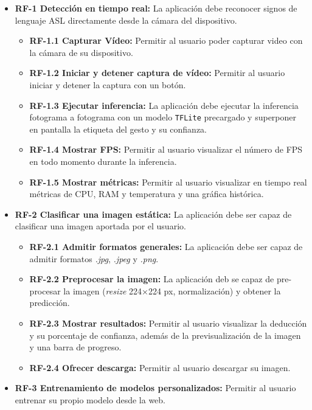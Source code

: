 \begin{itemize}
    \item \textbf{RF-1 Detección en tiempo real:} La aplicación debe reconocer signos de lenguaje ASL directamente desde la cámara del dispositivo.
        \begin{itemize}
            \item \textbf{RF-1.1 Capturar Vídeo:} Permitir al usuario poder capturar video con la cámara de su dispositivo.
            \item \textbf{RF-1.2 Iniciar y detener captura de vídeo:} Permitir al usuario iniciar y detener la captura con un botón.
            \item \textbf{RF-1.3 Ejecutar inferencia:} La aplicación debe ejecutar la inferencia fotograma a fotograma con un modelo \texttt{TFLite} precargado y superponer en pantalla la etiqueta del gesto y su confianza.
            \item \textbf{RF-1.4 Mostrar FPS:} Permitir al usuario visualizar el número de FPS en todo momento durante la inferencia.
            \item \textbf{RF-1.5 Mostrar métricas:} Permitir al usuario visualizar en tiempo real métricas de CPU, RAM y temperatura y una gráfica histórica.
        \end{itemize}
    \item \textbf{RF-2 Clasificar una imagen estática:} La aplicación debe ser capaz de clasificar una imagen aportada por el usuario.
        \begin{itemize}
            \item \textbf{RF-2.1 Admitir formatos generales:} La aplicación debe ser capaz de admitir formatos \textit{.jpg}, \textit{.jpeg} y \textit{.png}.
            \item \textbf{RF-2.2 Preprocesar la imagen:} La aplicación deb se capaz de pre-procesar la imagen (\textit{resize} 224×224 px, normalización) y obtener la predicción.
            \item \textbf{RF-2.3 Mostrar resultados:} Permitir al usuario visualizar la deducción y su porcentaje de confianza, además de la previsualización de la imagen y una barra de progreso.
            \item  \textbf{RF-2.4 Ofrecer descarga:} Permitir al usuario descargar su imagen.
        \end{itemize}
    \item \textbf{RF-3 Entrenamiento de modelos personalizados:} Permitir al usuario entrenar su propio modelo desde la web.
        \begin{itemize}

\end{itemize}
\end{itemize}
